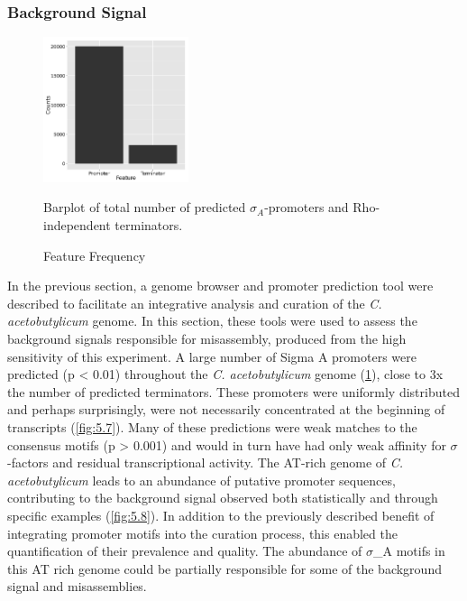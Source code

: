 


\subsubsection{Background Signal}
\begin{figure}
\small
\vspace{-20pt}
\begin{center}
\includegraphics[width=0.38\textwidth]{images/Assembly/Background_signal/prediction_frequency.png}
\end{center}
\vspace{-20pt}
\caption{Feature Frequency}\label{fig:5.6}
Barplot of total number of predicted $\sigma_{A}$-promoters and Rho-independent terminators.
\end{figure}

In the previous section, a genome browser and promoter prediction tool were described to facilitate an integrative analysis and curation of the \textit{C. acetobutylicum} genome. In this section, these tools were used to assess the background signals responsible for misassembly, produced from the high sensitivity of this experiment. A large number of Sigma A promoters were predicted (p < 0.01) throughout the \textit{C. acetobutylicum} genome (\ref{fig:5.6}), close to 3x the number of predicted terminators. These promoters were uniformly distributed and perhaps surprisingly, were not necessarily concentrated at the beginning of transcripts (\ref{fig:5.7}). Many of these predictions were weak matches to the consensus motifs (p > 0.001) and would in turn have had only weak affinity for $\sigma$-factors and residual transcriptional activity. The AT-rich genome of \textit{C. acetobutylicum} leads to an abundance of putative promoter sequences, contributing to the background signal observed both statistically and through specific examples (\ref{fig:5.8}). In addition to the previously described benefit of integrating promoter motifs into the curation process, this enabled the quantification of their prevalence and quality. The abundance of $\sigma$_{A} motifs in this AT rich genome could be partially responsible for some of the background signal and misassemblies.

